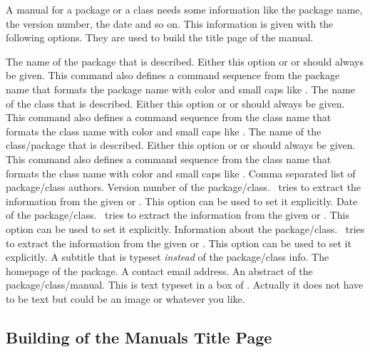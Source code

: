 \documentclass[load-preamble]{cnltx-doc}
\begin{document}
A manual for a package or a class needs some information like the package
name, the version number, the date and so on.  This information is given with
the following options.  They are used to build the title page of the manual.
\begin{options}
    The name of the package that is described.  Either this option or
     or  should always be given.  This command also
    defines a command sequence from the package name that formats the package
    name with color and small caps like \cnltx.
    The name of the class that is described.  Either this option or
     or  should always be given.  This command
    also defines a command sequence from the class name that formats the class
    name with color and small caps like \cnltx.
    The name of the class/package that is described.  Either this option or
     or  should always be given.  This command
    also defines a command sequence from the class name that formats the class
    name with color and small caps like \cnltx.
    Comma separated list of package/class authors.
    Version number of the package/class.  \cnltx\ tries to extract the
    information from the given  or .  This
    option can be used to set it explicitly.
    Date of the package/class.  \cnltx\ tries to extract the
    information from the given  or .  This
    option can be used to set it explicitly.
    Information about the package/class.  \cnltx\ tries to extract the
    information from the given  or .  This
    option can be used to set it explicitly.
    A subtitle that is typeset \emph{instead} of the package/class info.
    The homepage of the package.
    A contact email address.
    An abstract of the package/class/manual.  This is text typeset in a box of
    .  Actually it does not have to be text but could
      be an image or whatever you like.
\end{options}

\subsection{Building of the Manuals Title Page}
\end{document}
